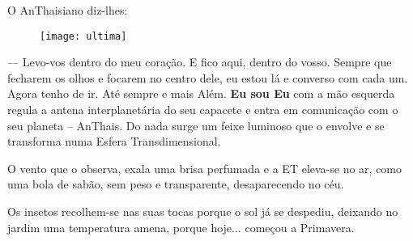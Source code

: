 O AnThaisiano diz-lhes:
\bigbreak
\begin{figure}[h]
    \centering
    \texttt{[image: ultima]}
\end{figure}

— Levo-vos dentro do meu coração. E fico aqui, dentro do vosso. Sempre que fecharem os olhos e focarem no centro dele, eu estou lá e converso com cada um. Agora tenho de ir. Até sempre e mais Além.
\bigbreak
\textbf{Eu sou Eu} com a mão esquerda regula a antena interplanetária do seu capacete e entra em comunicação com o seu planeta – AnThais. Do nada surge um feixe luminoso que o envolve e se transforma numa Esfera Transdimensional.

O vento que o observa, exala uma brisa perfumada e a ET eleva-se no ar, como uma bola de sabão, sem peso e transparente, desaparecendo no céu.

Os insetos recolhem-se nas suas tocas porque o sol já se despediu, deixando no jardim uma temperatura amena, porque hoje... começou a Primavera.
